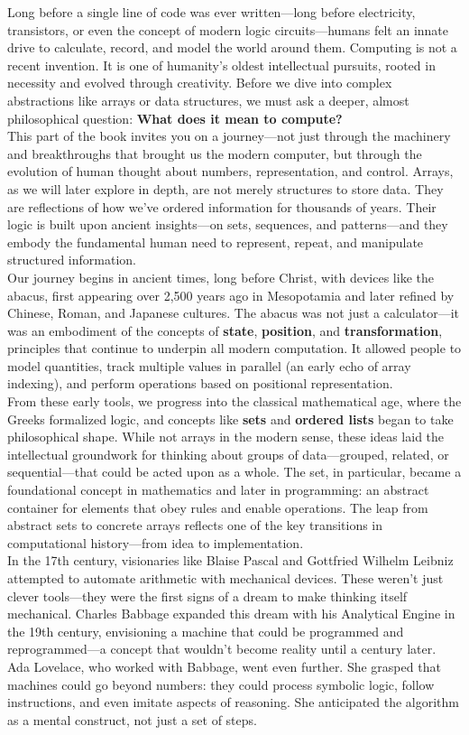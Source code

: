 \documentclass[12pt, oneside]{book}
\begin{document}
Long before a single line of code was ever written—long before electricity, transistors, or even the concept of modern logic circuits—humans felt an innate drive to calculate, record, and model the world around them. Computing is not a recent invention. It is one of humanity’s oldest intellectual pursuits, rooted in necessity and evolved through creativity. Before we dive into complex abstractions like arrays or data structures, we must ask a deeper, almost philosophical question: \textbf{What does it mean to compute?}\\
This part of the book invites you on a journey—not just through the machinery and breakthroughs that brought us the modern computer, but through the evolution of human thought about numbers, representation, and control. Arrays, as we will later explore in depth, are not merely structures to store data. They are reflections of how we’ve ordered information for thousands of years. Their logic is built upon ancient insights—on sets, sequences, and patterns—and they embody the fundamental human need to represent, repeat, and manipulate structured information.\\
Our journey begins in ancient times, long before Christ, with devices like the abacus, first appearing over 2,500 years ago in Mesopotamia and later refined by Chinese, Roman, and Japanese cultures. The abacus was not just a calculator—it was an embodiment of the concepts of \textbf{state}, \textbf{position}, and \textbf{transformation}, principles that continue to underpin all modern computation. It allowed people to model quantities, track multiple values in parallel (an early echo of array indexing), and perform operations based on positional representation.\\
From these early tools, we progress into the classical mathematical age, where the Greeks formalized logic, and concepts like \textbf{sets} and \textbf{ordered lists} began to take philosophical shape. While not arrays in the modern sense, these ideas laid the intellectual groundwork for thinking about groups of data—grouped, related, or sequential—that could be acted upon as a whole. The set, in particular, became a foundational concept in mathematics and later in programming: an abstract container for elements that obey rules and enable operations. The leap from abstract sets to concrete arrays reflects one of the key transitions in computational history—from idea to implementation.\\
In the 17th century, visionaries like Blaise Pascal and Gottfried Wilhelm Leibniz attempted to automate arithmetic with mechanical devices. These weren’t just clever tools—they were the first signs of a dream to make thinking itself mechanical. Charles Babbage expanded this dream with his Analytical Engine in the 19th century, envisioning a machine that could be programmed and reprogrammed—a concept that wouldn’t become reality until a century later. Ada Lovelace, who worked with Babbage, went even further. She grasped that machines could go beyond numbers: they could process symbolic logic, follow instructions, and even imitate aspects of reasoning. She anticipated the algorithm as a mental construct, not just a set of steps.\\
\end{document}
